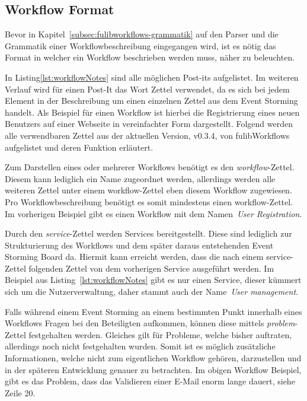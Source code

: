 \subsection{Workflow Format}\label{subsec:workflow-format}
Bevor in Kapitel~\ref{subsec:fulibworkflows-grammatik} auf den Parser und die Grammatik einer Workflowbeschreibung eingegangen wird,
ist es nötig das Format in welcher ein Workflow beschrieben werden muss, näher zu beleuchten.



In Listing\ref{lst:workflowNotes} sind alle möglichen Post-its aufgelistet.
Im weiteren Verlauf wird für einen Post-It das Wort Zettel verwendet, da es sich bei jedem Element in der Beschreibung um einen einzelnen Zettel aus dem Event Storming handelt.
Als Beispiel für einen Workflow ist hierbei die Registrierung eines neuen Benutzers auf einer Webseite in vereinfachter Form dargestellt.
Folgend werden alle verwendbaren Zettel aus der aktuellen Version, v0.3.4, von fulibWorkflows aufgelistet und deren Funktion erläutert.


Zum Darstellen eines oder mehrerer Workflows benötigt es den \textit{workflow}-Zettel.
Diesem kann lediglich ein Name zugeordnet werden, allerdings werden alle weiteren Zettel unter einem workflow-Zettel eben diesem Workflow zugewiesen.
Pro Workflowbeschreibung benötigt es somit mindestens einen workflow-Zettel.
Im vorherigen Beispiel gibt es einen Workflow mit dem Namen~\textit{User Registration}.


Durch den \textit{service}-Zettel werden Services bereitgestellt.
Diese sind lediglich zur Strukturierung des Workflows und dem später daraus entstehenden Event Storming Board da.
Hiermit kann erreicht werden, dass die nach einem service-Zettel folgenden Zettel von dem vorherigen Service ausgeführt werden.
Im Beispiel aus Listing~\ref{lst:workflowNotes} gibt es nur einen Service, dieser kümmert sich um die Nutzerverwaltung, daher
stammt auch der Name~\textit{User management}.


Falls während einem Event Storming an einem bestimmten Punkt innerhalb eines Workflows Fragen bei den Beteiligten aufkommen,
können diese mittels \textit{problem}-Zettel festgehalten werden.
Gleiches gilt für Probleme, welche bisher auftraten, allerdings noch nicht festgehalten wurden.
Somit ist es möglich zusätzliche Informationen, welche nicht zum eigentlichen Workflow gehören, darzustellen und in der
späteren Entwicklung genauer zu betrachten.
Im obigen Workflow Beispiel, gibt es das Problem, dass das Validieren einer E-Mail enorm lange dauert, siehe Zeile 20.

